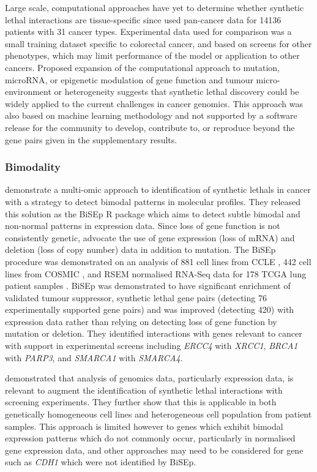 Large scale, computational approaches have yet to determine whether \gls{synthetic lethal} interactions are tissue-specific since \citet{Lu2015} used pan-cancer data for 14136 patients with 31 cancer types. Experimental data used for comparison was a small training dataset specific to colorectal cancer, and based on screens for other phenotypes, which may limit performance of the model or application to other cancers. Proposed expansion of the computational approach to mutation, microRNA, or epigenetic modulation of gene function and tumour micro-environment or heterogeneity suggests that \gls{synthetic lethal} discovery could be widely applied to the current challenges in cancer \gls{genomics}. This approach was also based on machine learning methodology and not supported by a software release for the community to develop, contribute to, or reproduce beyond the gene pairs given in the supplementary results. 

\subsubsection{Bimodality}

\citet{Wappett2016} demonstrate a multi-omic approach to identification of \glspl{synthetic lethal} in cancer with a strategy to detect bimodal patterns in molecular profiles. They released this solution as the \gls{BiSEp} R package \citet{Wappett2014} which aims to detect subtle bimodal and non-normal patterns in expression data. Since loss of gene function is not consistently genetic, \citet{Wappett2016} advocate the use of gene expression (loss of \gls{mRNA}) and deletion (loss of copy number) data in addition to mutation. The \gls{BiSEp} procedure was demonstrated on an analysis of 881 cell lines from \gls{CCLE} \citep{Barretina2012}, 442 cell lines from \gls{COSMIC} \citep{Forbes2015}, and RSEM normalised \gls{RNA-Seq} data for 178 \gls{TCGA} lung patient samples \citep{TCGA2014LU}. \gls{BiSEp} was demonstrated to have significant enrichment of validated tumour suppressor, \gls{synthetic lethal} gene pairs (detecting 76 experimentally supported gene pairs) and was improved (detecting 420) with expression data rather than relying on detecting loss of gene function by mutation or deletion. They identified interactions with genes relevant to cancer with support in experimental screens including \textit{ERCC4} with \textit{XRCC1}, \textit{BRCA1} with \textit{PARP3}, and \textit{SMARCA1} with \textit{SMARCA4}.

\citet{Wappett2016} demonstrated that analysis of \gls{genomics} data, particularly expression data, is relevant to augment the identification of \gls{synthetic lethal} interactions with screening experiments. They further show that this is applicable in both genetically homogeneous cell lines and heterogeneous cell population from patient samples. This approach is limited however to genes which exhibit bimodal expression patterns which do not commonly occur, particularly in normalised gene expression data, and other approaches may need to be considered for gene such as \textit{CDH1} which were not identified by \gls{BiSEp}.

